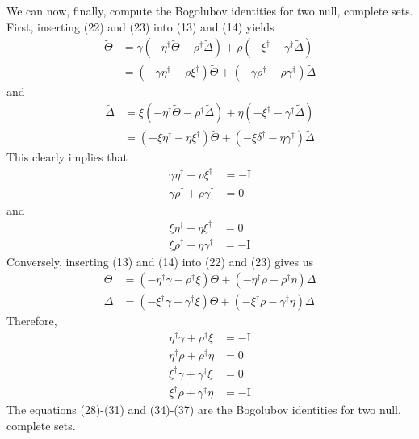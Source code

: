\documentclass[letterpaper]{article}
\newcommand{\DeltaT}{\ensuremath{\tilde{\Delta}}}
\newcommand{\ThetaT}{\ensuremath{\tilde{\Theta}}}
\newcommand{\parens}[1]{\ensuremath{\left(#1\right)}}
\begin{document}
We can now, finally, compute the Bogolubov identities for two null, complete sets.
First, inserting (22) and (23) into (13) and (14) yields
\begin{align}
\ThetaT &= \gamma\parens{-\eta^\dag\ThetaT-\rho^\dag\DeltaT}+\rho\parens{-\xi^\dag-\gamma^\dag\DeltaT}\\
&=\parens{-\gamma\eta^\dag-\rho\xi^\dag}\ThetaT+\parens{-\gamma\rho^\dag-\rho\gamma^\dag}\DeltaT
\end{align}
and
\begin{align}
\DeltaT&=\xi\parens{-\eta^\dag\ThetaT-\rho^\dag\DeltaT}+\eta\parens{-\xi^\dag-\gamma^\dag\DeltaT}\\
&=\parens{-\xi\eta^\dag-\eta\xi^\dag}\ThetaT+\parens{-\xi\delta^\dag-\eta\gamma^\dag}\DeltaT
\end{align}
This clearly implies that
\begin{align}
\gamma\eta^\dag+\rho\xi^\dag&=-\mathrm{I}\\
\gamma\rho^\dag+\rho\gamma^\dag&=0
\end{align}
and
\begin{align}
\xi\eta^\dag+\eta\xi^\dagger&=0\\
\xi\rho^\dag+\eta\gamma^\dag&=-\mathrm{I}
\end{align}
Conversely, inserting (13) and (14) into (22) and (23) gives us
\begin{align}
\Theta&=\parens{-\eta^\dag\gamma-\rho^\dag\xi}\Theta+\parens{-\eta^\dag\rho-\rho^\dag\eta}\Delta\\
\Delta&=\parens{-\xi^\dag\gamma-\gamma^\dag\xi}\Theta+\parens{-\xi^\dag\rho-\gamma^\dag\eta}\Delta
\end{align}
Therefore,
\begin{align}
\eta^\dag\gamma+\rho^\dag\xi&=-\mathrm{I}\\
\eta^\dag\rho+\rho^\dag\eta&=0\\
\xi^\dag\gamma+\gamma^\dag\xi&=0\\
\xi^\dag\rho+\gamma^\dag\eta&=-\mathrm{I}
\end{align}
The equations (28)-(31) and (34)-(37) are the Bogolubov identities for two null,
complete sets.
\end{document}
